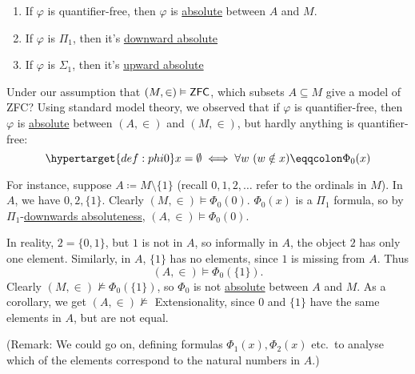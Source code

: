\documentclass{article}
\newcommand{\1}{\mathbbm{1}}
\let\models\vDash
\let\nModels\nvDash
\begin{document}
\begin{remark}
  \leavevmode
  \begin{enumerate}[label=(\alph*)]
    \item If $\varphi$ is quantifier-free, then $\varphi$ is \hyperlink{def:abso}{absolute} between $A$ and $M$.
    \item If $\varphi$ is \hyperlink{def:pi1}{$\Pi_1$}, then it's \hyperlink{def:abso}{downward absolute}
    \item If $\varphi$ is \hyperlink{def:sig1}{$\Sigma_1$}, then it's \hyperlink{def:abso}{upward absolute}
  \end{enumerate}
\end{remark}

\newlec
Under our assumption that $(M,\in) \models \text{\textsf{ZFC}}$, which subsets $A \subseteq M$ give a model of \textsf{ZFC}?
Using standard model theory, we observed that if $\varphi$ is quantifier-free, then $\varphi$ is \hyperlink{def:abso}{absolute} between $(A,\in)$ and $(M,\in)$, but hardly anything is quantifier-free:
\begin{equation*}
  \hypertarget{def:phi0}x = \emptyset \iff \forall w\ (w \notin x) \eqqcolon \Phi_0(x)
\end{equation*}

For instance, suppose $A \coloneqq M \setminus \{1\}$ (recall $0,1,2,\dotsc$ refer to the ordinals in $M$).
In $A$, we have $0,2,\{1\}$. Clearly $(M,\in) \models \Phi_0(0)$.
$\Phi_0(x)$ is a \hyperlink{def:pi1}{$\Pi_1$} formula, so by $\Pi_1$-\hyperlink{def:abso}{downwards absoluteness}, $(A,\in) \models \Phi_0(0)$.

In reality, $2 = \{0,1\}$, but $1$ is not in $A$, so informally in $A$, the object $2$ has only one element.
Similarly, in $A$, $\{1\}$ has no elements, since $1$ is missing from $A$. Thus
\begin{equation*}
  (A,\in) \models \Phi_0(\{1\}).
\end{equation*}
Clearly $(M,\in) \nModels \Phi_0(\{1\})$, so $\Phi_0$ is not \hyperlink{def:abso}{absolute} between $A$ and $M$.
As a corollary, we get $(A,\in) \nModels$ Extensionality, since $0$ and $\{1\}$ have the same elements in $A$, but are not equal.

(Remark: We could go on, defining formulas $\Phi_1(x), \Phi_2(x)$ etc.\ to analyse which of the elements correspond to the natural numbers in $A$.)
\end{document}
